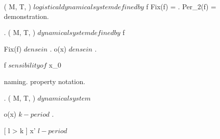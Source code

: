 \documentclass[../Main/main]{subfiles}
\begin{document}
{	
	{
		{
			( M, T, \phi ) $ logistical dynamical system defined by $ f
		}
		\holds
		{
			Fix(f) = .
			Per_2(f) = 
		}
		\demonstration
		{
			demonstration.
		}
	}
	
	
	{
		{
			.
			( M, T, \phi ) $ dynamical system defined by $ f
		}
		{
			Fix(f) $ dense in $ \R.
			{
				o(x) $ dense in $ \R
			}.

			f $ sensibility of $ x_0
		}
	}
	
	
	{
		{
			naming.
		}
		\denote
		{
			property \as notation.
		}
	}
	
	
	
	{
		{
			.
			( M, T, \phi ) $ dynamical system $
		}
		\holds
		{
			{
				o(x) $ k-period $
			}.

			\imp {}
			{
				{
					x' $ l-period $
				}
			}
		}
	}
	
	
	
		

}
\end{document}
